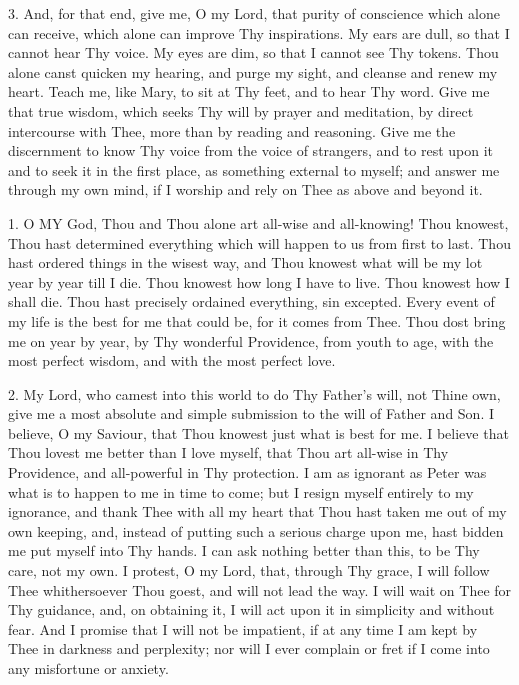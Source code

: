 3. And, for that end, give me, O
my Lord, that purity of conscience which alone can receive, which alone
can improve Thy inspirations. My ears are dull, so that I cannot hear
Thy voice. My eyes are dim, so that I cannot see Thy tokens. Thou alone
canst quicken my hearing, and purge my sight, and cleanse and renew my
heart. Teach me, like Mary, to sit at Thy feet, and to hear Thy word.
Give me that true wisdom, which seeks Thy will by prayer and meditation,
by direct intercourse with Thee, more than by reading and reasoning.
Give me the discernment to know Thy voice from the voice of strangers,
and to rest upon it and to seek it in the first place, as something
external to myself; and answer me through my own mind, if I worship and
rely on Thee as above and beyond it.


1. O MY
God, Thou and Thou alone art all-wise and all-knowing! Thou knowest,
Thou hast determined everything which will happen to us from first to
last. Thou hast ordered things in the
wisest way, and Thou knowest what will be my lot year by
year till I die. Thou knowest how long I have to live. Thou knowest how
I shall die. Thou hast precisely ordained everything, sin excepted.
Every event of my life is the best for me that could be, for it comes
from Thee. Thou dost bring me on year by year, by Thy wonderful
Providence, from youth to age, with the most perfect wisdom, and with
the most perfect love.

2. My Lord, who camest into this
world to do Thy Father's will, not Thine own, give me a most absolute
and simple submission to the will of Father and Son. I believe, O my
Saviour, that Thou knowest just what is best for me. I believe that Thou
lovest me better than I love myself, that Thou art all-wise in Thy
Providence, and all-powerful in Thy protection. I am as ignorant as
Peter was what is to happen to me in time to come; but I resign myself
entirely to my ignorance, and thank Thee with all my heart that Thou
hast taken me out of my own keeping, and, instead of putting such a
serious charge upon me, hast bidden me put myself into Thy hands. I can
ask nothing better than this, to be Thy care, not my own. I protest, O
my Lord, that, through Thy grace, I will follow Thee whithersoever Thou
goest, and will not lead the way. I will wait on Thee for Thy guidance,
and, on obtaining it, I will act upon it in simplicity and without fear.
And I promise that I will not be impatient, if at any time I am kept by
Thee in darkness and perplexity; nor will I ever complain or fret if I
come into any misfortune or anxiety.


